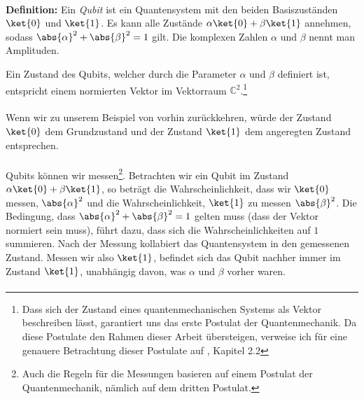 \paragraph{}
\textbf{Definition:} Ein \textit{Qubit} ist ein Quantensystem mit den beiden Basiszuständen $\ket{0}$ und $\ket{1}$. Es kann alle Zustände $\alpha\ket{0} + \beta\ket{1}$ annehmen, sodass $\abs{\alpha}^2 + \abs{\beta}^2 = 1$ gilt. Die komplexen Zahlen $\alpha$ und $\beta$ nennt man Amplituden.

Ein Zustand des Qubits, welcher durch die Parameter $\alpha$ und $\beta$ definiert ist, entspricht einem normierten Vektor im Vektorraum $\mathbb{C}^2$.\footnote{Dass sich der Zustand eines quantenmechanischen Systems als Vektor beschreiben lässt, garantiert uns das erste Postulat der Quantenmechanik. Da diese Postulate den Rahmen dieser Arbeit übersteigen, verweise ich für eine genauere Betrachtung dieser Postulate auf \cite{QC}, Kapitel 2.2}

\paragraph{}
Wenn wir zu unserem Beispiel von vorhin zurückkehren, würde der Zustand $\ket{0}$ dem Grundzustand und der Zustand $\ket{1}$ dem angeregten Zustand entsprechen.
\paragraph{}

Qubits können wir messen\footnote{Auch die Regeln für die Messungen basieren auf einem Postulat der Quantenmechanik, nämlich auf dem dritten Postulat.}. Betrachten wir ein Qubit im Zustand $\alpha\ket{0} + \beta\ket{1}$, so beträgt die Wahrscheinlichkeit, dass wir $\ket{0}$ messen, $\abs{\alpha}^2$ und die Wahrscheinlichkeit, $\ket{1}$ zu messen $\abs{\beta}^2$. Die Bedingung, dass $\abs{\alpha}^2 + \abs{\beta}^2 = 1$ gelten muss (dass der Vektor normiert sein muss), führt dazu, dass sich die Wahrscheinlichkeiten auf $1$ summieren. Nach der Messung kollabiert das Quantensystem in den gemessenen Zustand. Messen wir also $\ket{1}$, befindet sich das Qubit nachher immer im Zustand $\ket{1}$, unabhängig davon, was $\alpha$ und $\beta$ vorher waren.

\paragraph{}


